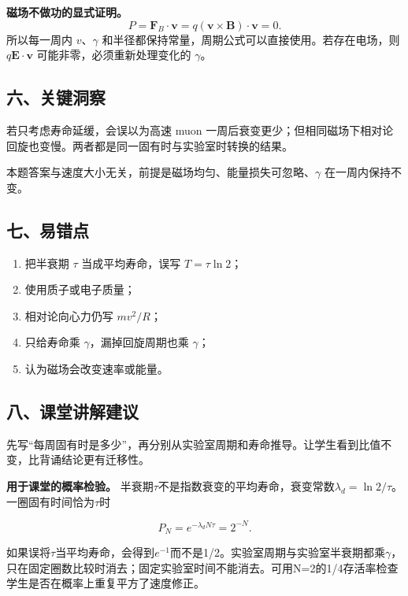 \documentclass[12pt,a4paper,UTF8]{ctexart}
\newcommand{\tightlist}{\setlength{\itemsep}{0pt}\setlength{\parskip}{0pt}}
\begin{document}
\textbf{磁场不做功的显式证明。} \[
P=\boldsymbol F_B\cdot\boldsymbol v
=q(\boldsymbol v\times\boldsymbol B)\cdot\boldsymbol v=0.
\] 所以每一周内 \(v\)、\(\gamma\)
和半径都保持常量，周期公式可以直接使用。若存在电场，则
\(q\boldsymbol E\cdot\boldsymbol v\) 可能非零，必须重新处理变化的
\(\gamma\)。

\subsection{六、关键洞察}\label{ux516dux5173ux952eux6d1eux5bdf-5}

若只考虑寿命延缓，会误以为高速 muon
一周后衰变更少；但相同磁场下相对论回旋也变慢。两者都是同一固有时与实验室时转换的结果。

本题答案与速度大小无关，前提是磁场均匀、能量损失可忽略、\(\gamma\)
在一周内保持不变。

\subsection{七、易错点}\label{ux4e03ux6613ux9519ux70b9-5}

\begin{enumerate}
\def\labelenumi{\arabic{enumi}.}
\tightlist
\item
  把半衰期 \(\tau\) 当成平均寿命，误写 \(T=\tau\ln2\)；
\item
  使用质子或电子质量；
\item
  相对论向心力仍写 \(mv^2/R\)；
\item
  只给寿命乘 \(\gamma\)，漏掉回旋周期也乘 \(\gamma\)；
\item
  认为磁场会改变速率或能量。
\end{enumerate}

\subsection{八、课堂讲解建议}\label{ux516bux8bfeux5802ux8bb2ux89e3ux5efaux8bae-5}

先写``每周固有时是多少''，再分别从实验室周期和寿命推导。让学生看到比值不变，比背诵结论更有迁移性。

\textbf{用于课堂的概率检验。}
半衰期\(\tau\)不是指数衰变的平均寿命，衰变常数\(\lambda_d=\ln2/\tau\)。一圈固有时间恰为\(\tau\)时

\[P_N=e^{-\lambda_dN\tau}=2^{-N}.\]

如果误将\(\tau\)当平均寿命，会得到\(e^{-1}\)而不是1/2。实验室周期与实验室半衰期都乘\(\gamma\)，只在固定圈数比较时消去；固定实验室时间不能消去。可用N=2的1/4存活率检查学生是否在概率上重复平方了速度修正。
\end{document}
